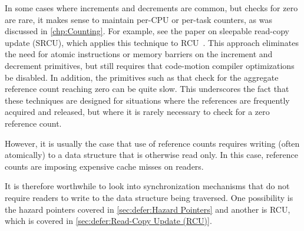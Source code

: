 In some cases where increments and decrements are common, but checks
for zero are rare, it makes sense to maintain per-CPU or per-task
counters, as was discussed in \cref{chp:Counting}.
For example, see the paper on sleepable read-copy update (SRCU), which
applies this technique to RCU~\cite{PaulEMcKenney2006c}.
This approach eliminates the need for atomic instructions or memory
barriers on the increment and decrement primitives, but still requires
that code-motion compiler optimizations be disabled.
In addition, the primitives such as 
that check for the aggregate reference
count reaching zero can be quite slow.
This underscores the fact that these techniques are designed
for situations where the references are frequently acquired and
released, but where it is rarely necessary to check for a zero
reference count.


However, it is usually the case that use of reference counts requires
writing (often atomically) to a data structure that is otherwise
read only.
In this case, reference counts are imposing expensive cache misses
on readers.

It is therefore worthwhile to look into synchronization mechanisms
that do not require readers to write to the data structure being
traversed.
One possibility is the hazard pointers covered in
\cref{sec:defer:Hazard Pointers}
and another is RCU, which is covered in
\cref{sec:defer:Read-Copy Update (RCU)}.
